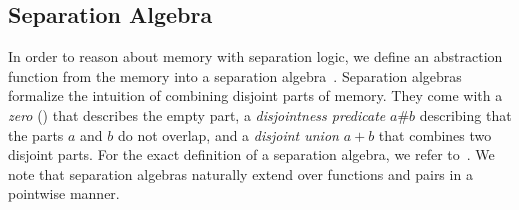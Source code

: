 \documentclass[sn-mathphys,Numbered]{sn-jnl}
\theoremstyle{thmstyleone}%
\theoremstyle{definition}%
\theoremstyle{thmstylethree}%
\begin{document}


  \subsection{Separation Algebra}
  In order to reason about memory with separation logic, we define an abstraction function from the memory into a separation algebra~\cite{CHY07}.
  Separation algebras formalize the intuition of combining disjoint parts of memory.
  They come with a \emph{zero} () that describes the empty part, a \emph{disjointness predicate} $a\#b$
  describing that the parts $a$ and $b$ do not overlap, and a \emph{disjoint union} $a+b$ that combines two disjoint parts.
  For the exact definition of a separation algebra, we refer to~\cite{CHY07,KKB12}. We note that
  separation algebras naturally extend over functions and pairs in a pointwise manner.

%
%
\end{document}
